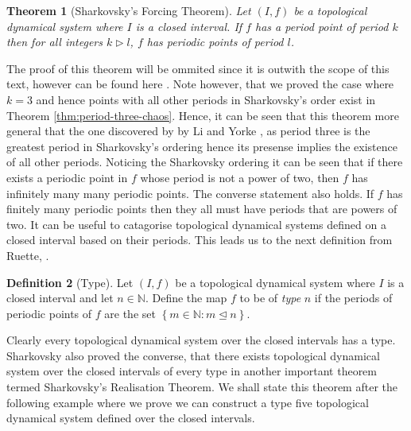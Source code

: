 \documentclass[11pt,a4paper,oneside]{memoir}
\theoremstyle{plain}
\newtheorem{thm}{Theorem}[chapter]
\theoremstyle{definition}
\newtheorem{defn}[thm]{Definition}
\begin{document}
\begin{thm}[Sharkovsky's Forcing Theorem] \label{thm:sharkovskys-forcing-theorem}
    Let $(I, f)$ be a topological dynamical system where $I$ is a closed interval. If $f$ has a period point of period $k$ then for all integers $k \rhd l$, $f$ has periodic points of period $l$.
\end{thm}

The proof of this theorem will be ommited since it is outwith the scope of this text, however can be found here \cite{sharkovsky}. Note however, that we proved the case where $k = 3$ and hence points with all other periods in Sharkovsky's order exist in Theorem \ref{thm:period-three-chaos}. Hence, it can be seen that this theorem more general that the one discovered by by Li and Yorke \cite{li-yorke}, as period three is the greatest period in Sharkovsky's ordering hence its presense implies the existence of all other periods. Noticing the Sharkovsky ordering it can be seen that if there exists a periodic point in $f$ whose period is not a power of two, then $f$ has infinitely many many periodic points. The converse statement also holds. If $f$ has finitely many periodic points then they all must have periods that are powers of two. It can be useful to catagorise topological dynamical systems defined on a closed interval based on their periods. This leads us to the next definition from Ruette, \cite[Section 3.3]{ruette}.

\begin{defn}[Type] \label{def:type}
    Let $(I, f)$ be a topological dynamical system where $I$ is a closed interval and let $n \in \mathbb{N}$. Define the map $f$ to be of \emph{type} $n$ if the periods of periodic points of $f$ are the set $\left\lbrace m \in \mathbb{N} : m \unlhd n \right\rbrace$.
\end{defn}

Clearly every topological dynamical system over the closed intervals has a type. Sharkovsky also proved the converse, that there exists topological dynamical system over the closed intervals of every type in another important theorem termed Sharkovsky's Realisation Theorem. We shall state this theorem after the following example where we prove we can construct a type five topological dynamical system defined over the closed intervals.
\end{document}
